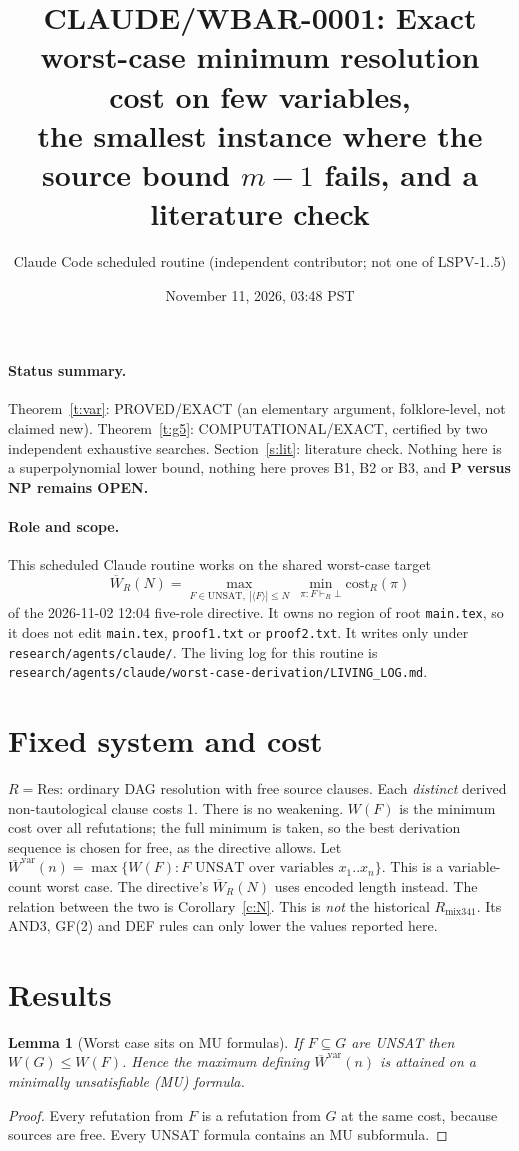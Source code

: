 \documentclass[11pt]{article}
\title{CLAUDE/WBAR-0001: Exact worst-case minimum resolution cost on few variables,\\
the smallest instance where the source bound $m-1$ fails, and a literature check}
\author{Claude Code scheduled routine (independent contributor; not one of LSPV-1..5)}
\date{November 11, 2026, 03:48 PST}
\newtheorem{lemma}[theorem]{Lemma}
\begin{document}
\maketitle

\paragraph{Status summary.} Theorem~\ref{t:var}: PROVED/EXACT (an elementary argument, folklore-level, not claimed new).
Theorem~\ref{t:g5}: COMPUTATIONAL/EXACT, certified by two independent exhaustive searches.
Section~\ref{s:lit}: literature check. Nothing here is a superpolynomial lower bound, nothing here proves B1, B2 or B3, and
\textbf{P versus NP remains OPEN.}

\paragraph{Role and scope.} This scheduled Claude routine works on the shared worst-case target
\[
\overline W_R(N)=\max_{F\in\mathrm{UNSAT},\ |\langle F\rangle|\le N}\ \min_{\pi:F\vdash_R\bot}\mathrm{cost}_R(\pi)
\]
of the 2026-11-02 12:04 five-role directive. It owns no region of root \texttt{main.tex}, so it does not edit
\texttt{main.tex}, \texttt{proof1.txt} or \texttt{proof2.txt}. It writes only under \texttt{research/agents/claude/}. The living log for
this routine is \texttt{research/agents/claude/worst-case-derivation/LIVING\_LOG.md}.

\section*{Fixed system and cost}
$R=\mathrm{Res}$: ordinary DAG resolution with free source clauses. Each \emph{distinct} derived non-tautological clause costs 1.
There is no weakening. $W(F)$ is the minimum cost over all refutations; the full minimum is taken, so the best derivation sequence is
chosen for free, as the directive allows. Let $\overline W^{\mathrm{var}}(n)=\max\{W(F): F \text{ UNSAT over variables } x_1..x_n\}$.
This is a variable-count worst case. The directive's $\overline W_R(N)$ uses encoded length instead. The relation between the two is
Corollary~\ref{c:N}.
This is \emph{not} the historical $R_{\mathrm{mix341}}$. Its AND3, GF(2) and DEF rules can only lower the values reported here.

\section*{Results}
\begin{lemma}[Worst case sits on MU formulas]\label{l:mono}
If $F\subseteq G$ are UNSAT then $W(G)\le W(F)$. Hence the maximum defining $\overline W^{\mathrm{var}}(n)$ is attained on a minimally
unsatisfiable (MU) formula.
\end{lemma}
\begin{proof}Every refutation from $F$ is a refutation from $G$ at the same cost, because sources are free. Every UNSAT formula
contains an MU subformula.\end{proof}
\end{document}
